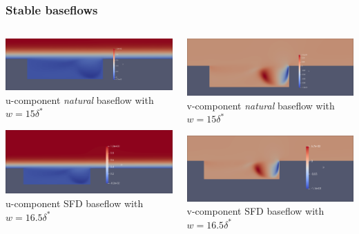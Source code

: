 \documentclass[
  aspectratio=169, %
  t, %
  onlytextwidth, %
  10pt, %
]{beamer}
\begin{document}
\begin{frame}
  \frametitle{Stable baseflows}
  \begin{columns}[T] %
    \begin{column}{0.48\linewidth} %
      {
	\centering
	\includegraphics[width=\linewidth]{Images/ubf15.png}
	u-component \emph{natural} baseflow with $w = 15\delta^*$

	\centering
	\includegraphics[width=\linewidth]{Images/ubf16.5.png}
	u-component SFD baseflow with $w = 16.5\delta^*$
      }
    \end{column}
    \begin{column}{0.48\linewidth} %
      {
	\centering
	\includegraphics[width=\linewidth]{Images/vbf15.png}
	v-component \textit{natural} baseflow with $w = 15\delta^*$

	\centering
	\includegraphics[width=\linewidth]{Images/vbf16.5.png}
	v-component SFD baseflow with $w = 16.5\delta^*$
      }
    \end{column}
  \end{columns}
\end{frame}
\end{document}
